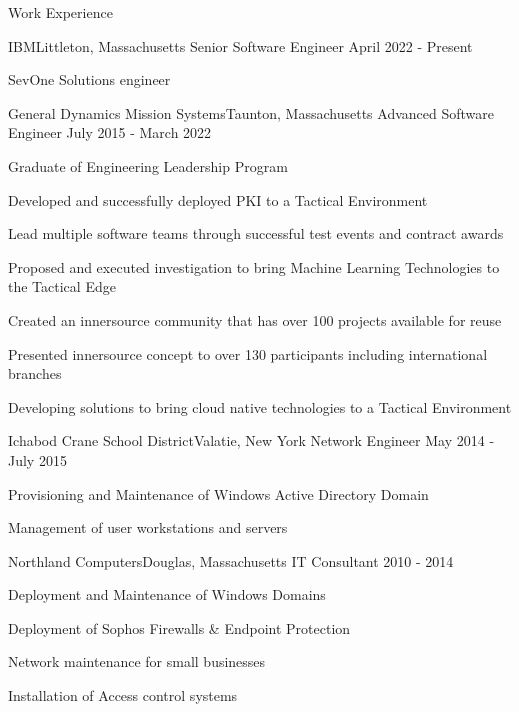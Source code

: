 \documentclass{resume} %
\begin{document}
\begin{rSection}{Work Experience}

\begin{rSubsection}{IBM}{Littleton, Massachusetts}
{Senior Software Engineer}
{April 2022 - Present}
\item SevOne Solutions engineer
\end{rSubsection}

\begin{rSubsection}{General Dynamics Mission Systems}{Taunton, Massachusetts}
{Advanced Software Engineer}
{July 2015 - March 2022}
 \item Graduate of Engineering Leadership Program
 \item Developed and successfully deployed PKI to a Tactical Environment
 \item Lead multiple software teams through successful test events and contract awards
 \item Proposed and executed investigation to bring Machine Learning Technologies to the Tactical Edge
 \item Created an innersource community that has over 100 projects available for reuse
 \item Presented innersource concept to over 130 participants including international branches
 \item Developing solutions to bring cloud native technologies to a Tactical Environment
\end{rSubsection}

\begin{rSubsection}{Ichabod Crane School District}{Valatie, New York}
{Network Engineer}
{ May 2014 - July 2015}
\item Provisioning and Maintenance of Windows Active Directory Domain 
\item Management of user workstations and servers

\end{rSubsection}

\begin{rSubsection}{Northland Computers}{Douglas, Massachusetts}
{IT Consultant} 
{2010 - 2014}
\item Deployment and Maintenance of Windows Domains 
\item Deployment of Sophos Firewalls \& Endpoint Protection 
\item Network maintenance for small businesses  
\item Installation of Access control systems

\end{rSubsection}

\end{rSection}
\end{document}

